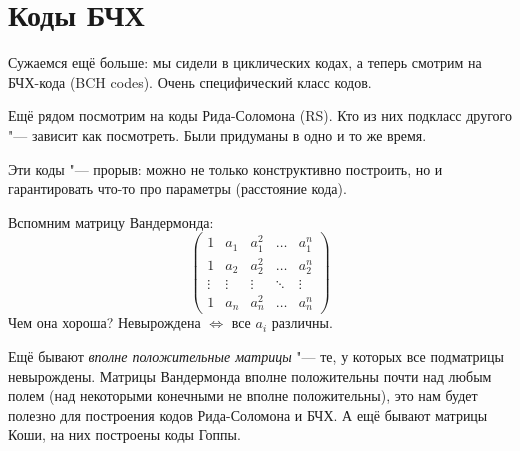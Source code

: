 \section{Коды БЧХ}
Сужаемся ещё больше: мы сидели в циклических кодах,
а теперь смотрим на БЧХ-кода (BCH codes).
Очень специфический класс кодов.

Ещё рядом посмотрим на коды Рида-Соломона (RS).
Кто из них подкласс другого "--- зависит как посмотреть.
Были придуманы в одно и то же время.

Эти коды "--- прорыв: можно не только конструктивно
построить, но и гарантировать что-то про параметры
(расстояние кода).

Вспомним матрицу Вандермонда:
\[
\begin{pmatrix}
1 & a_1 & a_1^2 & \dots & a_1^n \\
1 & a_2 & a_2^2 & \dots & a_2^n \\
\vdots & \vdots & \vdots & \ddots & \vdots \\
1 & a_n & a_n^2 & \dots & a_n^n
\end{pmatrix}
\]
Чем она хороша?
Невырождена $\iff$ все $a_i$ различны.

Ещё бывают \textit{вполне положительные матрицы} "--- те, у которых
все подматрицы невырождены.
Матрицы Вандермонда вполне положительны почти над любым полем
(над некоторыми конечными не вполне положительны), это нам будет полезно
для построения кодов Рида-Соломона и БЧХ.
А ещё бывают матрицы Коши, на них построены коды Гоппы.

